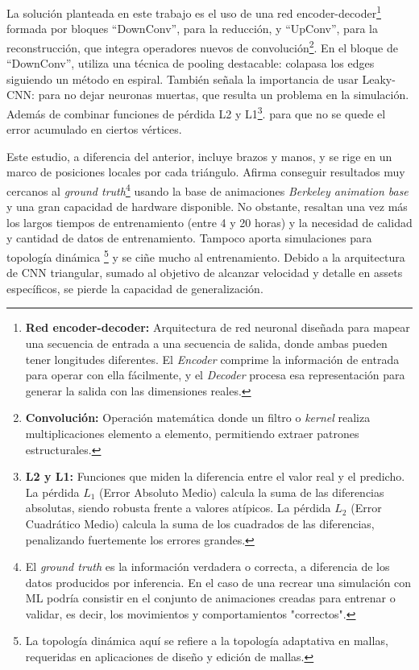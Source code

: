 La solución planteada en este trabajo es el uso de una red encoder-decoder\footnote{\textbf{Red encoder-decoder: }Arquitectura de red neuronal diseñada para mapear una secuencia de entrada a una secuencia de salida, donde ambas pueden tener longitudes diferentes. El \textit{Encoder} comprime la información de entrada para operar con ella fácilmente, y el \textit{Decoder} procesa esa representación para generar la salida con las dimensiones reales.} formada por bloques ``DownConv'', para la reducción, y ``UpConv'', para la reconstrucción, que integra operadores nuevos de convolución\footnote{\textbf{Convolución: }Operación matemática donde un filtro o \textit{kernel} realiza multiplicaciones elemento a elemento, permitiendo extraer patrones estructurales.}. En el bloque de ``DownConv'', utiliza una técnica de pooling destacable: colapasa los edges siguiendo un método en espiral. También señala la importancia de usar Leaky-CNN: para no dejar neuronas muertas, que resulta un problema en la simulación. Además de combinar funciones de pérdida L2 y L1\footnote{\textbf{L2 y L1: }Funciones que miden la diferencia entre el valor real y el predicho. La pérdida $L_1$ (Error Absoluto Medio) calcula la suma de las diferencias absolutas, siendo robusta frente a valores atípicos. La pérdida $L_2$ (Error Cuadrático Medio) calcula la suma de los cuadrados de las diferencias, penalizando fuertemente los errores grandes.}. para que no se quede el error acumulado en ciertos vértices.\newline

Este estudio, a diferencia del anterior, incluye brazos y manos, y se rige en un marco de posiciones locales por cada triángulo.
Afirma conseguir resultados muy cercanos al \textit{ground truth}\footnote{El \textit{ground truth} es la información verdadera o correcta, a diferencia de los datos producidos por inferencia. En el caso de una recrear una simulación con ML podría consistir en el conjunto de animaciones creadas para entrenar o validar, es decir, los movimientos y comportamientos "correctos".} usando la base de animaciones \textit{Berkeley animation base} y una gran capacidad de hardware disponible. No obstante, resaltan una vez más los largos tiempos de entrenamiento (entre 4 y 20 horas) y la necesidad de calidad y cantidad de datos de entrenamiento. Tampoco aporta simulaciones para topología dinámica \footnote{La topología dinámica aquí se refiere a la topología adaptativa en mallas, requeridas en aplicaciones de diseño y edición de mallas.} y se ciñe mucho al entrenamiento. Debido a la arquitectura de CNN triangular, sumado al objetivo de alcanzar velocidad y detalle en assets específicos, se pierde la capacidad de generalización.  \newline

